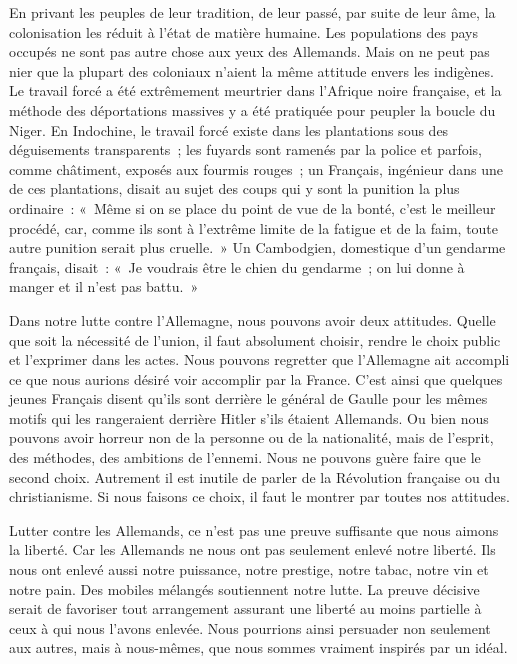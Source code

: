 \documentclass[french,twoside]{book} %
\begin{document}
En privant les peuples de leur tradition, de leur passé, par suite de leur âme, la colonisation les réduit à l'état de matière humaine. Les populations des pays occupés ne sont pas autre chose aux yeux des Allemands. Mais on ne peut pas nier que la plupart des coloniaux n'aient la même attitude envers les indigènes. Le travail forcé a été extrêmement meurtrier dans l'Afrique noire française, et la méthode des déportations massives y a été pratiquée pour peupler la boucle du Niger. En Indochine, le travail forcé existe dans les plantations sous des déguisements transparents ; les fuyards sont ramenés par la police et parfois, comme châtiment, exposés aux fourmis rouges ; un Français, ingénieur dans une de ces plantations, disait au sujet des coups qui y sont la punition la plus ordinaire : « Même si on se place du point de vue de la bonté, c'est le meilleur procédé, car, comme ils sont à l'extrême limite de la fatigue et de la faim, toute autre punition serait plus cruelle. » Un Cambod­gien, domestique d'un gendarme français, disait : « Je voudrais être le chien du gendarme ; on lui donne à manger et il n'est pas battu. »\par
Dans notre lutte contre l'Allemagne, nous pouvons avoir deux attitudes. Quelle que soit la nécessité de l'union, il faut absolument choisir, rendre le choix public et l'exprimer dans les actes. Nous pouvons regretter que l'Alle­magne ait accompli ce que nous aurions désiré voir accomplir par la France. C'est ainsi que quelques jeunes Français disent qu'ils sont derrière le général de Gaulle pour les mêmes motifs qui les rangeraient derrière Hitler s'ils étaient Allemands. Ou bien nous pouvons avoir horreur non de la personne ou de la nationalité, mais de l'esprit, des méthodes, des ambitions de l'ennemi. Nous ne pouvons guère faire que le second choix. Autrement il est inutile de parler de la Révolution française ou du christianisme. Si nous faisons ce choix, il faut le montrer par toutes nos attitudes.\par
Lutter contre les Allemands, ce n'est pas une preuve suffisante que nous aimons la liberté. Car les Allemands ne nous ont pas seulement enlevé notre liberté. Ils nous ont enlevé aussi notre puissance, notre prestige, notre tabac, notre vin et notre pain. Des mobiles mélangés soutiennent notre lutte. La preuve décisive serait de favoriser tout arrangement assurant une liberté au moins partielle à ceux à qui nous l'avons enlevée. Nous pourrions ainsi persuader non seulement aux autres, mais à nous-mêmes, que nous sommes vraiment inspirés par un idéal.\par
\end{document}
